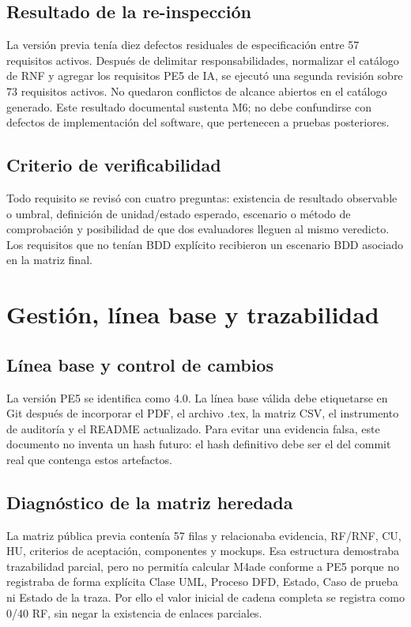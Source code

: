 \documentclass[11pt,a4paper]{article}
\begin{document}
	\subsection{Resultado de la re-inspección}
	La versión previa tenía diez defectos residuales de especificación entre 57 requisitos activos. Después de delimitar responsabilidades, normalizar el catálogo de RNF y agregar los requisitos PE5 de IA, se ejecutó una segunda revisión sobre 73 requisitos activos. No quedaron conflictos de alcance abiertos en el catálogo generado. Este resultado documental sustenta M6; no debe confundirse con defectos de implementación del software, que pertenecen a pruebas posteriores.
	
	\subsection{Criterio de verificabilidad}
	Todo requisito se revisó con cuatro preguntas: existencia de resultado observable o umbral, definición de unidad/estado esperado, escenario o método de comprobación y posibilidad de que dos evaluadores lleguen al mismo veredicto. Los requisitos que no tenían BDD explícito recibieron un escenario BDD asociado en la matriz final.
	\clearpage

	\section{Gestión, línea base y trazabilidad}
	\subsection{Línea base y control de cambios}
	La versión PE5 se identifica como 4.0. La línea base válida debe etiquetarse en Git después de incorporar el PDF, el archivo .tex, la matriz CSV, el instrumento de auditoría y el README actualizado. Para evitar una evidencia falsa, este documento no inventa un hash futuro: el hash definitivo debe ser el del commit real que contenga estos artefactos.
	
	\subsection{Diagnóstico de la matriz heredada}
	La matriz pública previa contenía 57 filas y relacionaba evidencia, RF/RNF, CU, HU, criterios de aceptación, componentes y mockups. Esa estructura demostraba trazabilidad parcial, pero no permitía calcular M4ade conforme a PE5 porque no registraba de forma explícita Clase UML, Proceso DFD, Estado, Caso de prueba ni Estado de la traza. Por ello el valor inicial de cadena completa se registra como 0/40 RF, sin negar la existencia de enlaces parciales.
	
\end{document}
